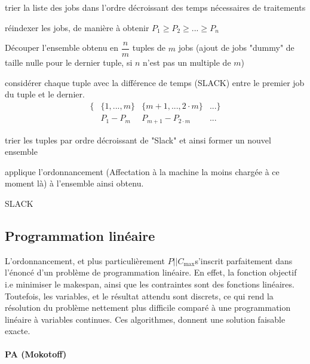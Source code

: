 \documentclass[a4paper,12pt]{report}
\theoremstyle{plain}				%
\theoremstyle{definition}				%
\newcommand\problemGrahamP{$P||C_{\max}$}
\begin{document}
\bigskip
\begin{algorithm}[H]
\DontPrintSemicolon

trier la liste des jobs dans l'ordre décroissant des temps nécessaires de traitements

\BlankLine %
réindexer les jobs, de manière à obtenir $P_1 \geq P_2 \geq ... \geq P_n$

\BlankLine %
Découper l'ensemble obtenu en $\dfrac{n}{m}$ tuples de $m$ jobs (ajout
de jobs "dummy" de taille nulle pour le dernier tuple, si $n$ n'est
pas un multiple de $m$)

\BlankLine %
considérer chaque tuple avec la différence de temps (SLACK) entre le
premier job du tuple et le dernier.
\begin{align*}
\{ &\{1, ..., m\} &\{m+1,..., 2 \cdot m\} &... \} \\
   &P_1 - P_m     &P_{m+1}-P_{2 \cdot m}  &...
\end{align*}


\BlankLine %
trier les tuples par ordre décroissant de "Slack" et ainsi former un nouvel ensemble

\BlankLine %
applique l'ordonnancement (Affectation à la machine la moins chargée à ce moment là) à l'ensemble ainsi obtenu.

\caption{SLACK\label{SLACK}}
\end{algorithm}

\subsection{Programmation linéaire}

L'ordonnancement, et plus particulièrement \problemGrahamP s'inscrit
parfaitement dans l'énoncé d'un problème de programmation linéaire.
En effet, la fonction objectif i.e minimiser le makespan, ainsi que
les contraintes sont des fonctions linéaires.
Toutefois, les variables, et le résultat attendu sont discrets, ce qui
rend la résolution du problème nettement plus difficile comparé à une
programmation linéaire à variables continues.
Ces algorithmes, donnent une solution faisable exacte.

\paragraph{PA (Mokotoff)}
\end{document}
